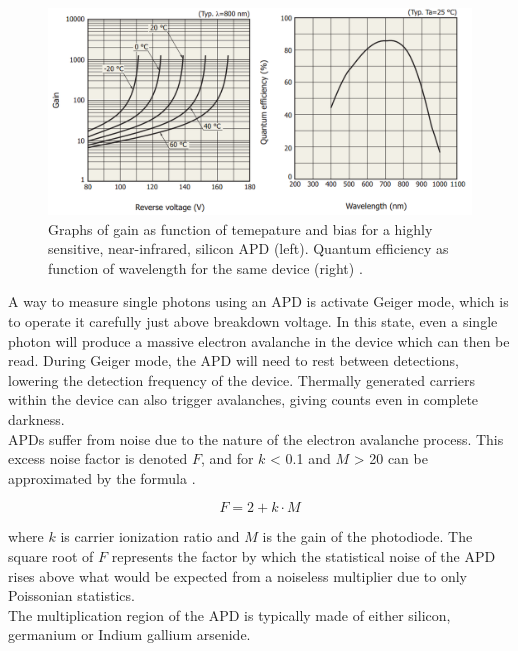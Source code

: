 \begin{figure}[htb]
\begin{center}
\includegraphics[scale=0.8]{figures/RCS/APD_specs}
\caption{Graphs of gain as function of temepature and bias for a highly sensitive, near-infrared, silicon APD (left). Quantum efficiency as function of wavelength for the same device (right) \cite{APD_graphs}.}
\label{fig:APD_specs}
\end{center}
\end{figure}

A way to measure single photons using an APD is activate Geiger mode, which is to operate it carefully just above breakdown voltage. In this state, even a single photon will produce a massive electron avalanche in the device which can then be read. During Geiger mode, the APD will need to rest between detections, lowering the detection frequency of the device. Thermally generated carriers within the device can also trigger avalanches, giving counts even in complete darkness.\\

APDs suffer from noise due to the nature of the electron avalanche process. This excess noise factor is denoted $F$, and for $k$ < 0.1 and $M$ > 20 can be approximated by the formula \cite{APD_noise}.

\begin{equation}
    F = 2 + k \cdot M
\end{equation}

where $k$ is carrier ionization ratio and $M$ is the gain of the photodiode. The square root of $F$ represents the factor by which the statistical noise of the APD rises above what would be expected from a noiseless multiplier due to only Poissonian statistics.\\

The  multiplication region of the APD is typically made of either silicon, germanium or Indium gallium arsenide.

